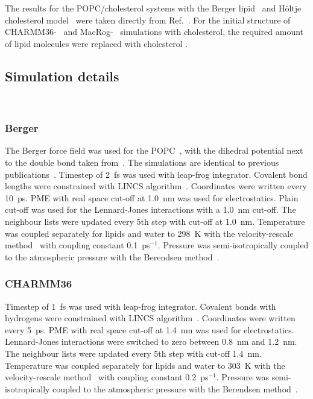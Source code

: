 \documentclass[pre,aps,floatfix,authordate1-4,twocolumn]{revtex4-1}
\begin{document}
The results for the POPC/cholesterol systems with the Berger lipid~\cite{berger97} and H\"oltje
cholesterol model~\cite{holtje01} were taken directly from Ref.~\cite{ferreira13}.
For the initial structure of CHARMM36-~\cite{klauda10,lim12} and MacRog-~\cite{maciejewski14,kulig14} simulations with cholesterol,
the required amount of lipid molecules were replaced with cholesterol . 


\subsection{Simulation details} 
 \\
\subsubsection{Berger}


The Berger force field was used for the POPC~\cite{berger97}, with the dihedral potential next to the double bond 
taken from~\cite{bachar04}. The simulations are identical to previous publications~\cite{ollila07a,ferreira13,ferreira14b}.
Timestep of 2~fs was used with leap-frog integrator. Covalent bond lengths were constrained with LINCS algorithm~\cite{hess97,hess07}. 
Coordinates were written every 10~ps. PME with real space cut-off at 1.0~nm was used 
for electrostatics. Plain cut-off was used for the Lennard-Jones interactions with a 1.0~nm cut-off.
The neighbour lists were updated every 5th step with cut-off at 1.0~nm. Temperature was coupled separately
for lipids and water to 298~K with the velocity-rescale method~\cite{bussi07} with coupling constant 0.1~ps$^{-1}$.
Pressure was semi-isotropically coupled to the atmospheric pressure with the Berendsen method~\cite{berendsen84}.

\subsubsection{CHARMM36}

Timestep of 1~fs was used with leap-frog integrator. Covalent bonds with hydrogens were constrained with LINCS algorithm~\cite{hess97,hess07}. 
Coordinates were written every 5~ps. PME with real space cut-off at 1.4~nm was used 
for electrostatics. Lennard-Jones interactions were switched to zero between 0.8~nm and 1.2~nm.
The neighbour lists were updated every 5th step with cut-off 1.4~nm. Temperature was coupled separately
for lipids and water to 303~K with the velocity-rescale method~\cite{bussi07} with coupling constant 0.2~ps$^{-1}$.
Pressure was semi-isotropically coupled to the atmospheric pressure with the Berendsen method~\cite{berendsen84}.
\end{document}
